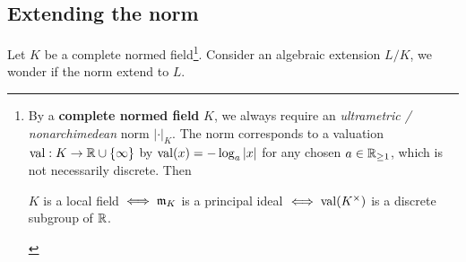 
\subsection{Extending the norm}
Let $K$ be a complete normed field\footnote{By a \textbf{complete normed field} $K$,
we always require an \textit{ultrametric / nonarchimedean} norm $|\cdot|_K$. The norm corresponds to a valuation $\operatorname{val} : K\to\mathbb{R}\cup\{\infty\}$ by $\operatorname{val}(x) = -\log_a|x|$ for any chosen $a\in \mathbb{R}_{\ge 1}$, which is not necessarily discrete.
Then \begin{center}
    $K$ is a local field $\iff \mathfrak{m}_K$ is a principal ideal $\iff \operatorname{val}(K^\times)$ is a discrete subgroup of $\mathbb{R}$.
\end{center}
}.
Consider an algebraic extension $L/K$, we wonder if the norm extend to $L$.

